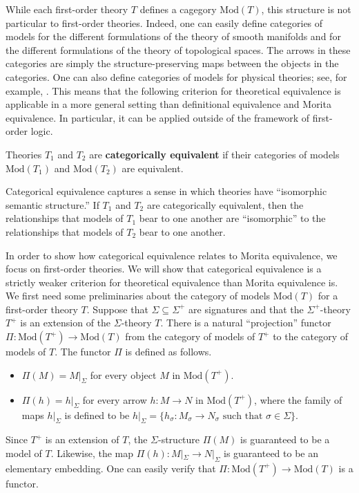 While each first-order theory $T$ defines a cagegory
$\mathrm{Mod}(T)$, this structure is not particular to first-order
theories.  Indeed, one can easily define categories of models for the
different formulations of the theory of smooth manifolds and for the
different formulations of the theory of topological spaces.  The
arrows in these categories are simply the structure-preserving maps
between the objects in the categories.  One can also define categories
of models for physical theories; see, for example,
\cite{barrett2014,rosenstock,weatherall-erk,weatherallgauge,weatherall2015}.
This means that the following criterion for theoretical equivalence is
applicable in a more general setting than definitional equivalence and
Morita equivalence.  In particular, it can be applied outside of the
framework of first-order logic.

\begin{defn} Theories $T_1$ and $T_2$ are \textbf{categorically
    equivalent} if their categories of models $\text{Mod}(T_1)$ and
  $\text{Mod}(T_2)$ are equivalent.
\end{defn}

Categorical equivalence captures a sense in which theories have
``isomorphic semantic structure.'' If $T_1$ and $T_2$ are
categorically equivalent, then the relationships that models of $T_1$
bear to one another are ``isomorphic'' to the relationships that
models of $T_2$ bear to one another.

In order to show how categorical equivalence relates to Morita
equivalence, we focus on first-order theories. We will show that
categorical equivalence is a strictly weaker criterion for theoretical
equivalence than Morita equivalence is. We first need some
preliminaries about the category of models $\mathrm{Mod}(T)$ for a
first-order theory $T$. Suppose that $\Sigma\subseteq\Sigma^+$ are
signatures and that the $\Sigma^+$-theory $T^+$ is an extension of the
$\Sigma$-theory $T$. There is a natural ``projection'' functor
$\Pi:\text{Mod}(T^+)\rightarrow \text{Mod}(T)$ from the category of
models of $T^+$ to the category of models of $T$. The functor $\Pi$ is
defined as follows.
\begin{itemize}
\item $\Pi(M)=M|_\Sigma$ for every object $M$ in $\text{Mod}(T^+)$.
\item $\Pi(h)=h|_\Sigma$ for every arrow $h:M\rightarrow N$ in $\text{Mod}(T^+)$, where the family of maps $h|_\Sigma$ is defined to be $h|_\Sigma=\{h_\sigma: M_\sigma\rightarrow N_\sigma\text{ such that } \sigma\in \Sigma\}$.
\end{itemize}
Since $T^+$ is an extension of $T$, the $\Sigma$-structure $\Pi(M)$ is
guaranteed to be a model of $T$. Likewise, the map
$\Pi(h):M|_\Sigma\rightarrow N|_\Sigma$ is guaranteed to be an
elementary embedding. One can easily verify that
$\Pi:\text{Mod}(T^+)\rightarrow\text{Mod}(T)$ is a functor.

